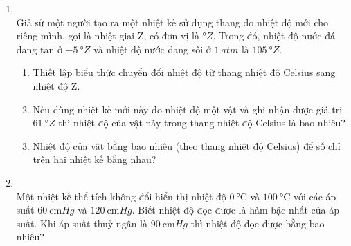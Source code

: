 \begin{enumerate}[label=\bfseries Câu \arabic*:, leftmargin=1.7cm]
\item {}\\
Giả sử một người tạo ra một nhiệt kế sử dụng thang đo nhiệt độ mới cho riêng mình, gọi là nhiệt giai Z, có đơn vị là $\si{\degree Z}$. Trong đó, nhiệt độ nước đá đang tan ở $\SI{-5}{\degree Z}$ và nhiệt độ nước đang sôi ở $\SI{1}{atm}$ là $\SI{105}{\degree Z}$.
\begin{enumerate}[label=\alph*)]
	\item Thiết lập biểu thức chuyển đổi nhiệt độ từ thang nhiệt độ Celsius sang nhiệt độ Z.
	\item Nếu dùng nhiệt kế mới này đo nhiệt độ một vật và ghi nhận được giá trị $\SI{61}{\degree Z}$ thì nhiệt độ của vật này trong thang nhiệt độ Celsius là bao nhiêu?
	\item Nhiệt độ của vật bằng bao nhiêu (theo thang nhiệt độ Celsius) để số chỉ trên hai nhiệt kế bằng nhau?
\end{enumerate}

\item {}\\
Một nhiệt kế thể tích không đổi hiển thị nhiệt độ $\SI{0}{\celsius}$ và $\SI{100}{\celsius}$ với các áp suất $\SI{60}{\centi\meter Hg}$ và $\SI{120}{\centi\meter Hg}$. Biết nhiệt độ đọc được là hàm bậc nhất của áp suất. Khi áp suất thuỷ ngân là $\SI{90}{\centi\meter Hg}$ thì nhiệt độ đọc được bằng bao nhiêu?
\end{enumerate}